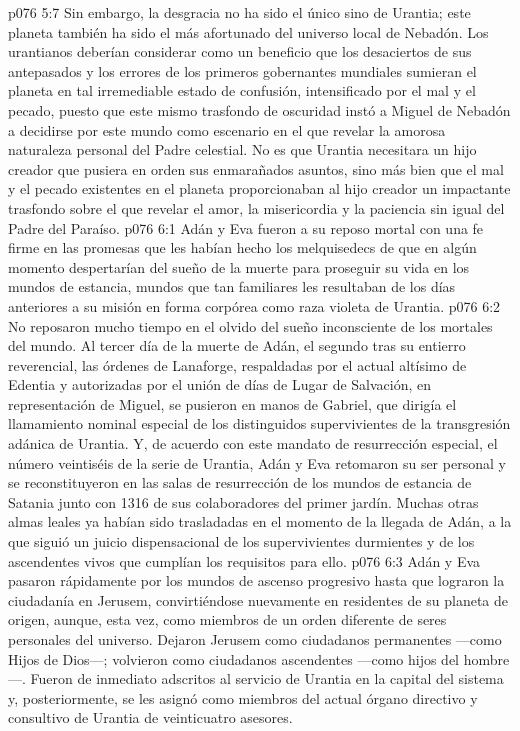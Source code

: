 \vs p076 5:7 Sin embargo, la desgracia no ha sido el único sino de Urantia; este planeta también ha sido el más afortunado del universo local de Nebadón. Los urantianos deberían considerar como un beneficio que los desaciertos de sus antepasados y los errores de los primeros gobernantes mundiales sumieran el planeta en tal irremediable estado de confusión, intensificado por el mal y el pecado, puesto que este mismo trasfondo de oscuridad instó a Miguel de Nebadón a decidirse por este mundo como escenario en el que revelar la amorosa naturaleza personal del Padre celestial. No es que Urantia necesitara un hijo creador que pusiera en orden sus enmarañados asuntos, sino más bien que el mal y el pecado existentes en el planeta proporcionaban al hijo creador un impactante trasfondo sobre el que revelar el amor, la misericordia y la paciencia sin igual del Padre del Paraíso.
\vs p076 6:1 Adán y Eva fueron a su reposo mortal con una fe firme en las promesas que les habían hecho los melquisedecs de que en algún momento despertarían del sueño de la muerte para proseguir su vida en los mundos de estancia, mundos que tan familiares les resultaban de los días anteriores a su misión en forma corpórea como raza violeta de Urantia.
\vs p076 6:2 No reposaron mucho tiempo en el olvido del sueño inconsciente de los mortales del mundo. Al tercer día de la muerte de Adán, el segundo tras su entierro reverencial, las órdenes de Lanaforge, respaldadas por el actual altísimo de Edentia y autorizadas por el unión de días de Lugar de Salvación, en representación de Miguel, se pusieron en manos de Gabriel, que dirigía el llamamiento nominal especial de los distinguidos supervivientes de la transgresión adánica de Urantia. Y, de acuerdo con este mandato de resurrección especial, el número veintiséis de la serie de Urantia, Adán y Eva retomaron su ser personal y se reconstituyeron en las salas de resurrección de los mundos de estancia de Satania junto con 1316 de sus colaboradores del primer jardín. Muchas otras almas leales ya habían sido trasladadas en el momento de la llegada de Adán, a la que siguió un juicio dispensacional de los supervivientes durmientes y de los ascendentes vivos que cumplían los requisitos para ello.
\vs p076 6:3 \pc Adán y Eva pasaron rápidamente por los mundos de ascenso progresivo hasta que lograron la ciudadanía en Jerusem, convirtiéndose nuevamente en residentes de su planeta de origen, aunque, esta vez, como miembros de un orden diferente de seres personales del universo. Dejaron Jerusem como ciudadanos permanentes ---como Hijos de Dios---; volvieron como ciudadanos ascendentes ---como hijos del hombre---. Fueron de inmediato adscritos al servicio de Urantia en la capital del sistema y, posteriormente, se les asignó como miembros del actual órgano directivo y consultivo de Urantia de veinticuatro asesores.
